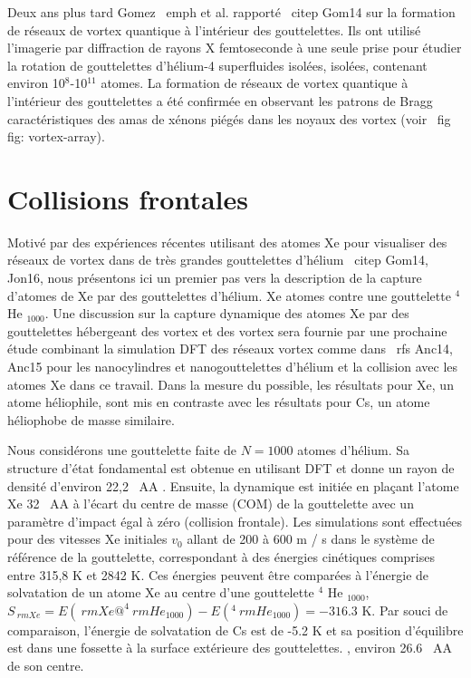 		Deux ans plus tard Gomez \ emph {et al}. rapporté \ citep {Gom14} sur la formation de réseaux de vortex quantique à l'intérieur des gouttelettes. Ils ont utilisé l'imagerie par diffraction de rayons X femtoseconde à une seule prise pour étudier la rotation de gouttelettes d'hélium-4 superfluides isolées, isolées, contenant environ 10$^8$-10$^{11}$ atomes. La formation de réseaux de vortex quantique à l'intérieur des gouttelettes a été confirmée en observant les patrons de Bragg caractéristiques des amas de xénons piégés dans les noyaux des vortex (voir \ fig {fig: vortex-array}).
	
	\section*{Collisions frontales}
		Motivé par des expériences récentes utilisant des atomes Xe pour visualiser des réseaux de vortex dans de très grandes gouttelettes d'hélium \ citep {Gom14, Jon16}, nous présentons ici un premier pas vers la description de la capture d'atomes de Xe par des gouttelettes d'hélium. Xe atomes contre une gouttelette $ ^ 4 $ He $ _ {1000} $. Une discussion sur la capture dynamique des atomes Xe par des gouttelettes hébergeant des vortex et des vortex sera fournie par une prochaine étude combinant la simulation DFT des réseaux vortex comme dans \ rfs {Anc14, Anc15} pour les nanocylindres et nanogouttelettes d'hélium et la collision avec les atomes Xe dans ce travail. Dans la mesure du possible, les résultats pour Xe, un atome héliophile, sont mis en contraste avec les résultats pour Cs, un atome héliophobe de masse similaire.
		
		Nous considérons une gouttelette faite de $ N = 1000 $ atomes d'hélium. Sa structure d'état fondamental est obtenue en utilisant DFT et donne un rayon de densité d'environ 22,2 \ AA {}. Ensuite, la dynamique est initiée en plaçant l'atome Xe 32 \ AA {} à l'écart du centre de masse (COM) de la gouttelette avec un paramètre d'impact égal à zéro (collision frontale). Les simulations sont effectuées pour des vitesses Xe initiales $ v_0 $ allant de 200 à 600 m / s dans le système de référence de la gouttelette, correspondant à des énergies cinétiques comprises entre 315,8 K et 2842 K. Ces énergies peuvent être comparées à l'énergie de solvatation de un atome Xe au centre d'une gouttelette $ ^ 4 $ He $ _ {1000} $, $ S _ {{\ rm Xe}} = E ({\ rm Xe} @ ^ 4 {\ rm He} _ {1000} ) - E (^ 4 {\ rm He} _ {1000}) = -316.3 $ K. Par souci de comparaison, l'énergie de solvatation de Cs est de -5.2 K et sa position d'équilibre est dans une fossette à la surface extérieure des gouttelettes. , environ 26.6 \ AA {} de son centre.
		
